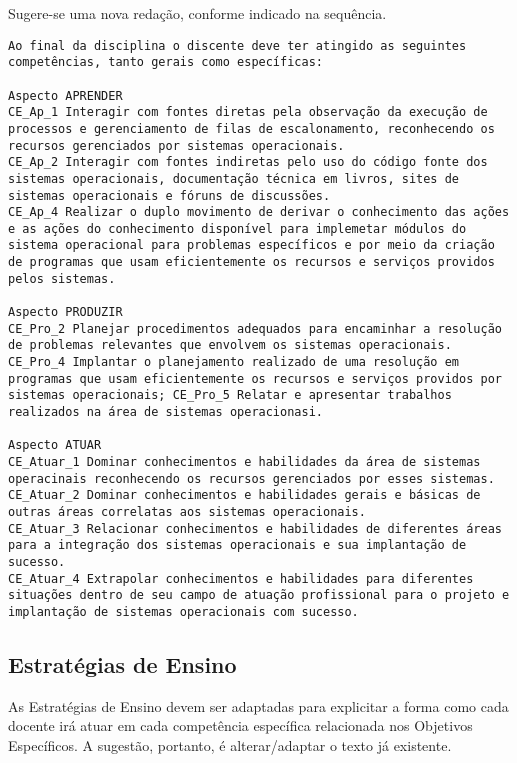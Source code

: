 \documentclass[12pt, oneside]{book}
\begin{document}
Sugere-se uma nova redação, conforme indicado na sequência.

\begin{lstlisting}
Ao final da disciplina o discente deve ter atingido as seguintes competências, tanto gerais como específicas:

Aspecto APRENDER
CE_Ap_1 Interagir com fontes diretas pela observação da execução de processos e gerenciamento de filas de escalonamento, reconhecendo os recursos gerenciados por sistemas operacionais.
CE_Ap_2 Interagir com fontes indiretas pelo uso do código fonte dos sistemas operacionais, documentação técnica em livros, sites de sistemas operacionais e fóruns de discussões.
CE_Ap_4 Realizar o duplo movimento de derivar o conhecimento das ações e as ações do conhecimento disponível para implemetar módulos do sistema operacional para problemas específicos e por meio da criação de programas que usam eficientemente os recursos e serviços providos pelos sistemas.

Aspecto PRODUZIR
CE_Pro_2 Planejar procedimentos adequados para encaminhar a resolução de problemas relevantes que envolvem os sistemas operacionais.
CE_Pro_4 Implantar o planejamento realizado de uma resolução em programas que usam eficientemente os recursos e serviços providos por sistemas operacionais; CE_Pro_5 Relatar e apresentar trabalhos realizados na área de sistemas operacionasi.

Aspecto ATUAR
CE_Atuar_1 Dominar conhecimentos e habilidades da área de sistemas operacinais reconhecendo os recursos gerenciados por esses sistemas.
CE_Atuar_2 Dominar conhecimentos e habilidades gerais e básicas de outras áreas correlatas aos sistemas operacionais.
CE_Atuar_3 Relacionar conhecimentos e habilidades de diferentes áreas para a integração dos sistemas operacionais e sua implantação de sucesso.
CE_Atuar_4 Extrapolar conhecimentos e habilidades para diferentes situações dentro de seu campo de atuação profissional para o projeto e implantação de sistemas operacionais com sucesso.
\end{lstlisting}

\subsection*{Estratégias de Ensino}
As Estratégias de Ensino devem ser adaptadas para explicitar a forma como cada docente irá atuar em cada competência específica relacionada nos Objetivos Específicos. A sugestão, portanto, é alterar/adaptar o texto já existente.
\end{document}
